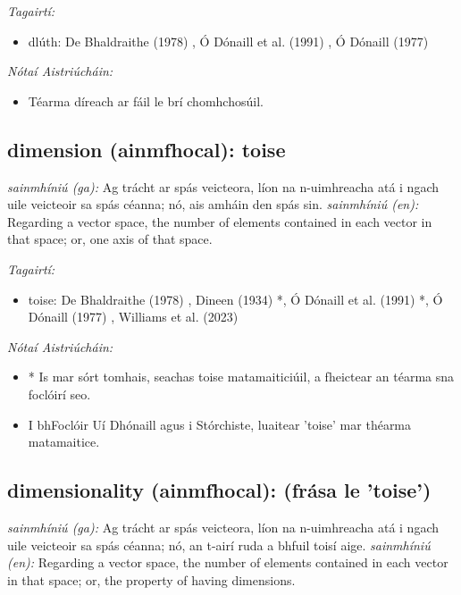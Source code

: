\documentclass{article}
\begin{document}
 \noindent \textit{Tagairtí:}
\begin{itemize}
	\item dlúth: De Bhaldraithe (1978) \cite{de-bhaldraithe}, Ó Dónaill et al. (1991) \cite{focloir-beag}, Ó Dónaill (1977) \cite{odonaill}
\end{itemize}

 \noindent \textit{Nótaí Aistriúcháin:}
\begin{itemize}
	\item Téarma díreach ar fáil le brí chomhchosúil.
\end{itemize}


\subsection*{dimension (ainmfhocal): toise} 
 \noindent \textit{sainmhíniú (ga):} Ag trácht ar spás veicteora, líon na n-uimhreacha atá i ngach uile veicteoir sa spás céanna; nó, ais amháin den spás sin.
\newline\newline
 \noindent \textit{sainmhíniú (en):} Regarding a vector space, the number of elements contained in each vector in that space; or, one axis of that space.
\newline

 \noindent \textit{Tagairtí:}
\begin{itemize}
	\item toise: De Bhaldraithe (1978) \cite{de-bhaldraithe}, Dineen (1934) \cite{dineen}*, Ó Dónaill et al. (1991) \cite{focloir-beag}*, Ó Dónaill (1977) \cite{odonaill}, Williams et al. (2023) \cite{storchiste}
\end{itemize}

 \noindent \textit{Nótaí Aistriúcháin:}
\begin{itemize}
	\item * Is mar sórt tomhais, seachas toise matamaiticiúil, a fheictear an téarma sna foclóirí seo.
	\item I bhFoclóir Uí Dhónaill agus i Stórchiste, luaitear 'toise' mar théarma matamaitice.
\end{itemize}


\subsection*{dimensionality (ainmfhocal): (frása le 'toise')} 
 \noindent \textit{sainmhíniú (ga):} Ag trácht ar spás veicteora, líon na n-uimhreacha atá i ngach uile veicteoir sa spás céanna; nó, an t-airí ruda a bhfuil toisí aige.
\newline\newline
 \noindent \textit{sainmhíniú (en):} Regarding a vector space, the number of elements contained in each vector in that space; or, the property of having dimensions.
\newline
\end{document}
